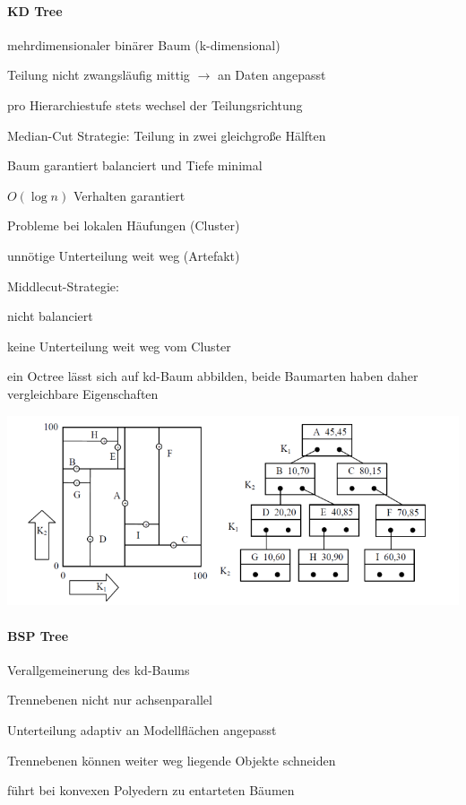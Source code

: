 \documentclass[landscape]{article}
\begin{document}
\begin{multicols}{3}
  \paragraph{KD Tree}
  \begin{itemize*}
    \item mehrdimensionaler binärer Baum (k-dimensional)
    \item Teilung nicht zwangsläufig mittig $\rightarrow$ an Daten angepasst
    \item pro Hierarchiestufe stets wechsel der Teilungsrichtung
    \item Median-Cut Strategie: Teilung in zwei gleichgroße Hälften
    \begin{itemize*}
      \item Baum garantiert balanciert und Tiefe minimal
      \item $O(\log n)$ Verhalten garantiert
      \item Probleme bei lokalen Häufungen (Cluster)
      \item unnötige Unterteilung weit weg (Artefakt)
    \end{itemize*}
    \item Middlecut-Strategie:
    \begin{itemize*}
      \item nicht balanciert
      \item keine Unterteilung weit weg vom Cluster
    \end{itemize*}
    \item ein Octree lässt sich auf kd-Baum abbilden, beide Baumarten haben daher vergleichbare Eigenschaften
  \end{itemize*}
  \begin{center}
    \includegraphics[width=.5 \linewidth]{Assets/Computergrafik_KD-tree}
  \end{center}
  
  \paragraph{BSP Tree}
  \begin{itemize*}
    \item Verallgemeinerung des kd-Baums
    \item Trennebenen nicht nur achsenparallel
    \item Unterteilung adaptiv an Modellflächen angepasst
    \item Trennebenen können weiter weg liegende Objekte schneiden
    \item führt bei konvexen Polyedern zu entarteten Bäumen
  \end{itemize*}
  

\end{multicols}
\end{document}
